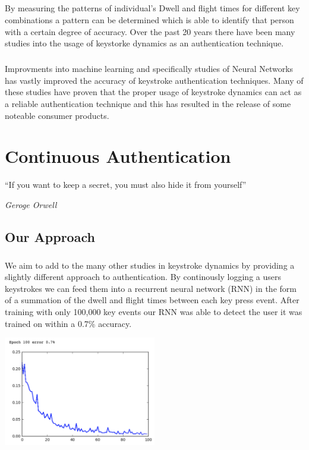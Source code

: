 \documentclass[fancychapters]{report}
\begin{document}
\paragraph{}By measuring the patterns of individual's Dwell and flight times for different key combinations a pattern can be determined which is able to identify that person with a certain degree of accuracy.
Over the past 20 years there have been many studies into the usage of keystorke dynamics as an authentication technique. \cite{KEYSTROKE2} \cite{KEYSTROKE3} \cite{KEYSTROKE4} \cite{KEYSTROKE5} \cite{KEYSTROKE6} 
\paragraph{}Improvments into machine learning and specifically studies of Neural Networks has vastly improved the accuracy of keystroke authentication techniques.   
Many of these studies have proven that the proper usage of keystroke dynamics can act as a reliable authentication technique \cite{KEYSTROKE7} and this has resulted in the release of some noteable consumer products. \cite{PROD1} \cite{PROD2} \cite{PROD3}

\chapter{Continuous Authentication}
\epigraph{``If you want to keep a secret, you must also hide it from yourself''}{ \textit{Geroge Orwell}}
\section{Our Approach}
\paragraph{}We aim to add to the many other studies in keystroke dynamics by providing a slightly different approach to authentication.
By continously logging a users keystrokes we can feed them into a recurrent neural network (RNN) in the form of a summation of the dwell and flight times between each key press event.
After training with only 100,000 key events our RNN was able to detect the user it was trained on within a 0.7\% accuracy. 

\begin{center}
\includegraphics[width=0.5\textwidth]{graph1}
\end{center}
\end{document}
